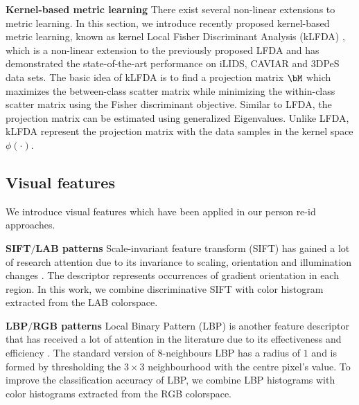 \documentclass[10pt,twocolumn,letterpaper]{article}
\renewcommand{\paragraph}{\textbf}
\begin{document}
\paragraph{Kernel-based metric learning}
%
There exist several non-linear extensions to metric learning.
In this section, we introduce recently proposed kernel-based
metric learning, known as kernel Local Fisher Discriminant
Analysis (kLFDA) \cite{Xiong2014Person},
which is a non-linear extension to the previously
proposed LFDA \cite{Pedagadi2013Local} and
has demonstrated the state-of-the-art
performance on iLIDS, CAVIAR and 3DPeS data sets.
The basic idea of kLFDA is to find a projection matrix $\bM$
which maximizes the between-class scatter matrix while minimizing
the within-class scatter matrix using the Fisher discriminant
objective.
Similar to LFDA, the projection matrix can be estimated using
generalized Eigenvalues.
Unlike LFDA, kLFDA represent the projection matrix with the
data samples in the kernel space $\phi(\cdot)$.
%
%

%
\subsection{Visual features}
\label{subsec:feat}
%
%
%
%
%
%
%
%
%
%
%
%
We introduce visual features which have been applied in
our person re-id approaches.

\paragraph{SIFT$/$LAB patterns}
Scale-invariant feature transform (SIFT) has
gained a lot of research attention
due to its invariance to scaling, orientation and illumination
changes \cite{Lowe2004Distinctive}.
The descriptor represents occurrences of gradient orientation
in each region.
In this work, we combine discriminative SIFT with color histogram
extracted from the LAB colorspace.

%
%
%
%
%
%
%
%
%
%
%
%
%
%
%
%
%
%




\paragraph{LBP$/$RGB patterns}
Local Binary Pattern (LBP) is another feature descriptor
that has received a lot of attention in the literature
due to its effectiveness and efficiency \cite{Ojala2002Multiresolution}.
The standard version of $8$-neighbours LBP has a radius of $1$
and is formed by thresholding the $3 \times 3$
neighbourhood with the centre pixel's value.
To improve the classification accuracy of LBP,
we combine LBP histograms with color histograms extracted
from the RGB colorspace.
\end{document}
